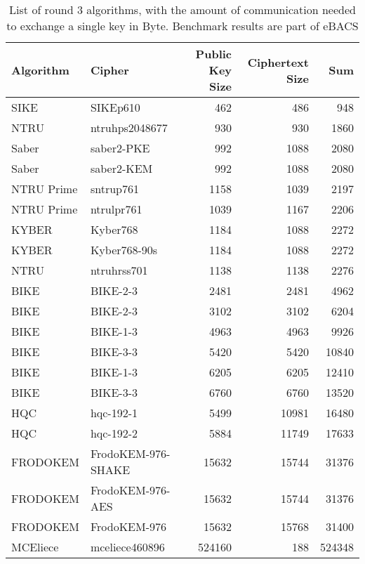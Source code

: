 \begin{table}[ht]
  \small
  \caption{List of round 3 algorithms, with the amount of communication needed to exchange a single key in Byte. Benchmark results are part of eBACS\cite{eBACS}}
  \begin{center}
      \begin{tabularx}{\textwidth}{X|lrrr}
      \hline
      \textbf{Algorithm} & \textbf{Cipher}  & \textbf{Public Key Size}  & \textbf{Ciphertext Size}  & \textbf{Sum}  \\
      \hline
      SIKE & SIKEp610 & 462 & 486 & 948 \\
      NTRU & ntruhps2048677 & 930 & 930 & 1860 \\
      Saber & saber2-PKE & 992 & 1088 & 2080 \\
      Saber & saber2-KEM & 992 & 1088 & 2080 \\
      NTRU Prime & sntrup761 & 1158 & 1039 & 2197 \\
      NTRU Prime & ntrulpr761 & 1039 & 1167 & 2206 \\
      KYBER & Kyber768 & 1184 & 1088 & 2272 \\
      KYBER & Kyber768-90s & 1184 & 1088 & 2272 \\
      NTRU & ntruhrss701 & 1138 & 1138 & 2276 \\
      BIKE & BIKE-2-3 & 2481 & 2481 & 4962 \\
      BIKE & BIKE-2-3 & 3102 & 3102 & 6204 \\
      BIKE & BIKE-1-3 & 4963 & 4963 & 9926 \\
      BIKE & BIKE-3-3 & 5420 & 5420 & 10840 \\
      BIKE & BIKE-1-3 & 6205 & 6205 & 12410 \\
      BIKE & BIKE-3-3 & 6760 & 6760 & 13520 \\
      HQC & hqc-192-1 & 5499 & 10981 & 16480 \\
      HQC & hqc-192-2 & 5884 & 11749 & 17633 \\
      FRODOKEM & FrodoKEM-976-SHAKE & 15632 & 15744 & 31376 \\
      FRODOKEM & FrodoKEM-976-AES & 15632 & 15744 & 31376 \\
      FRODOKEM & FrodoKEM-976 & 15632 & 15768 & 31400 \\
      MCEliece & mceliece460896 & 524160 & 188 & 524348 \\
      \hline
  \end{tabularx}
  \end{center}
  \label{table:r3_data}
\end{table}

